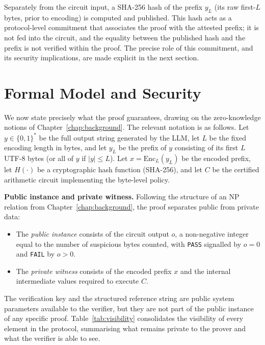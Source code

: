 \medskip

Separately from the circuit input, a SHA-256 hash of the prefix $y_L$ (its raw first-$L$ bytes, prior to encoding) is computed and published. This hash acts as a protocol-level commitment that associates the proof with the attested prefix; it is not fed into the circuit, and the equality between the published hash and the prefix is not verified within the proof. The precise role of this commitment, and its security implications, are made explicit in the next section.

\section{Formal Model and Security}
\label{sec:sd-formal}

We now state precisely what the proof guarantees, drawing on the zero-knowledge notions of Chapter~\ref{chap:background}. The relevant notation is as follows. Let $y \in \{0,1\}^{*}$ be the full output string generated by the LLM, let $L$ be the fixed encoding length in bytes, and let $y_L$ be the prefix of $y$ consisting of its first $L$ UTF-8 bytes (or all of $y$ if $|y| \le L$). Let $x = \mathrm{Enc}_L(y_L)$ be the encoded prefix, let $H(\cdot)$ be a cryptographic hash function (SHA-256), and let $C$ be the certified arithmetic circuit implementing the byte-level policy.

\medskip

\textbf{Public instance and private witness.} Following the structure of an NP relation from Chapter~\ref{chap:background}, the proof separates public from private data:
\begin{itemize}
    \item The \emph{public instance} consists of the circuit output $o$, a non-negative integer equal to the number of suspicious bytes counted, with \texttt{PASS} signalled by $o = 0$ and \texttt{FAIL} by $o > 0$.
    \item The \emph{private witness} consists of the encoded prefix $x$ and the internal intermediate values required to execute $C$.
\end{itemize}
The verification key and the structured reference string are public system parameters available to the verifier, but they are not part of the public instance of any specific proof. Table~\ref{tab:visibility} consolidates the visibility of every element in the protocol, summarising what remains private to the prover and what the verifier is able to see.

